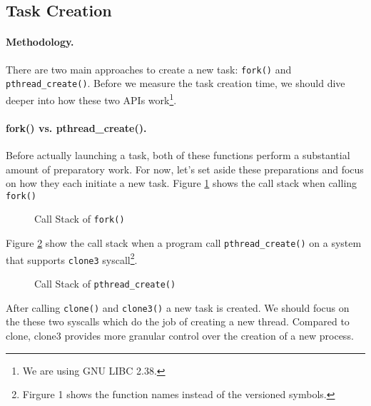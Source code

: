 \subsection{Task Creation} 
\paragraph{Methodology.} There are two main approaches to create a new task: \texttt{fork()} and \texttt{pthread\_create()}. Before we measure the task creation time, we should dive deeper into how these two APIs work\footnote{We are using GNU LIBC 2.38.}.

\paragraph{fork() vs. pthread\_create().} Before actually launching a task, both of these functions perform a substantial amount of preparatory work. For now, let's set aside these preparations and focus on how they each initiate a new task. Figure \ref{fig:fork-callstack} shows the call stack when calling \texttt{fork()}
\begin{figure}[htbp]
    \centering
    \caption{Call Stack of \texttt{fork()}}
    \label{fig:fork-callstack}
\end{figure}
Figure \ref{fig:pthread-callstack} show the call stack when a program call \texttt{pthread\_create()} on a system that supports \texttt{clone3} syscall\footnote{Firgure 1 shows the function names instead of the versioned symbols.}.
% 
\begin{figure}[htbp]
    \centering
    \caption{Call Stack of \texttt{pthread\_create()}}
    \label{fig:pthread-callstack}
\end{figure}
After calling \texttt{clone()} and \texttt{clone3()} a new task is created.
We should focus on the these two syscalls which do the job of creating a new thread. 
% 
Compared to clone, clone3 provides more granular control over the creation of a new process.

